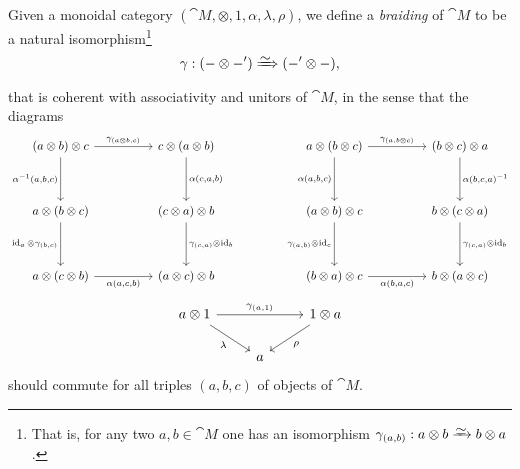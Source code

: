 \documentclass[../../deep-dive]{subfiles}
\begin{document}
\begin{definition}[Braiding]
    \label{def:braiding}
    Given a monoidal category \((\cat M, \otimes, 1, \alpha, \lambda, \rho)\), we
    define a \emph{braiding} of \(\cat M\) to be a natural isomorphism\footnote{That
        is, for any two \(a, b \in \cat M\) one has an isomorphism
        \(\gamma_{(a, b)}: a \otimes b \isoto b \otimes a\).}
    \[
        \gamma: (- \otimes -') \isonat (-' \otimes -),
    \]
    that is coherent with associativity and unitors of \(\cat M\), in the sense that
    the diagrams
    \[
        \begin{tikzcd}
            (a \otimes b) \otimes c
            \ar[rr, "\gamma_{(a \otimes b, c)}"]
            \ar[dd, "{\alpha^{-1}(a, b, c)}"']
            &&c \otimes (a \otimes b)
            \ar[dd, "{\alpha(c, a, b)}"]
            \\
            &&
            \\
            a \otimes (b \otimes c)
            \ar[dd, "\Id_a \otimes \gamma_{(b, c)}"']
            &&(c \otimes a) \otimes b
            \ar[dd, "\gamma_{(c, a)} \otimes \Id_b"]
            \\
            &&
            \\
            a \otimes (c \otimes b)
            \ar[rr, "\alpha{(a, c, b)}"']
            &&(a \otimes c) \otimes b
        \end{tikzcd}
        \qquad
        \qquad
        \begin{tikzcd}
            a \otimes (b \otimes c)
            \ar[rr, "\gamma_{(a, b \otimes c)}"]
            \ar[dd, "{\alpha(a, b, c)}"']
            &&(b \otimes c) \otimes a
            \ar[dd, "{\alpha(b, c, a)^{-1}}"]
            \\
            &&
            \\
            (a \otimes b) \otimes c
            \ar[dd, "\gamma_{(a, b)} \otimes \Id_c"']
            &&b \otimes (c \otimes a)
            \ar[dd, "\gamma_{(c, a)} \otimes \Id_b"]
            \\
            &&
            \\
            (b \otimes a) \otimes c
            \ar[rr, "\alpha{(b, a, c)}"']
            &&b \otimes (a \otimes c)
        \end{tikzcd}
    \]
    \[
        \begin{tikzcd}
            a \otimes 1 \ar[rr, "\gamma_{(a, 1)}"]
            \ar[rd, "\lambda"']
            &&1 \otimes a \ar[ld, "\rho"]
            \\
            &a &
        \end{tikzcd}
    \]
    should commute for all triples \((a, b, c)\) of objects of \(\cat M\).
\end{definition}
\end{document}
